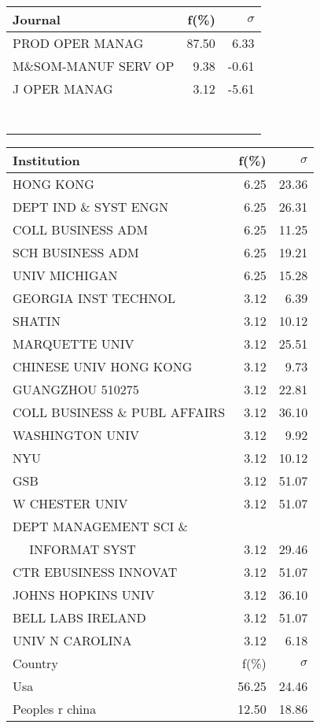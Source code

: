 \documentclass[a4paper,11pt]{report}
\begin{document}
\begin{landscape}
\begin{table}[!ht]
{\begin{tabular}{|l r  r|}
\hline
\hline
Journal & f(\%) & $\sigma$\\
\hline
PROD OPER MANAG & 87.50 & 6.33\\
M\&SOM-MANUF SERV OP & 9.38 & -0.61\\
J OPER MANAG & 3.12 & -5.61\\
 &  & \\
 &  & \\
 &  & \\
 &  & \\
 &  & \\
 &  & \\
 &  & \\
\hline
\end{tabular}
}
{\scriptsize\begin{tabular}{|l r r|}
\hline
Institution & f(\%) & $\sigma$\\
\hline
HONG KONG & 6.25 & 23.36\\
DEPT IND \& SYST ENGN & 6.25 & 26.31\\
COLL BUSINESS ADM & 6.25 & 11.25\\
SCH BUSINESS ADM & 6.25 & 19.21\\
UNIV MICHIGAN & 6.25 & 15.28\\
GEORGIA INST TECHNOL & 3.12 & 6.39\\
SHATIN & 3.12 & 10.12\\
MARQUETTE UNIV & 3.12 & 25.51\\
CHINESE UNIV HONG KONG & 3.12 & 9.73\\
GUANGZHOU 510275 & 3.12 & 22.81\\
COLL BUSINESS \& PUBL AFFAIRS & 3.12 & 36.10\\
WASHINGTON UNIV & 3.12 & 9.92\\
NYU & 3.12 & 10.12\\
GSB & 3.12 & 51.07\\
W CHESTER UNIV & 3.12 & 51.07\\
DEPT MANAGEMENT SCI \& &  & \\
$\quad$ INFORMAT SYST & 3.12 & 29.46\\
CTR EBUSINESS INNOVAT & 3.12 & 51.07\\
JOHNS HOPKINS UNIV & 3.12 & 36.10\\
BELL LABS IRELAND & 3.12 & 51.07\\
UNIV N CAROLINA & 3.12 & 6.18\\
\hline
\hline
Country & f(\%) & $\sigma$\\
\hline
Usa & 56.25 & 24.46\\
Peoples r china & 12.50 & 18.86\\

\end{tabular}}
\end{table}
\end{landscape}
\end{document}
